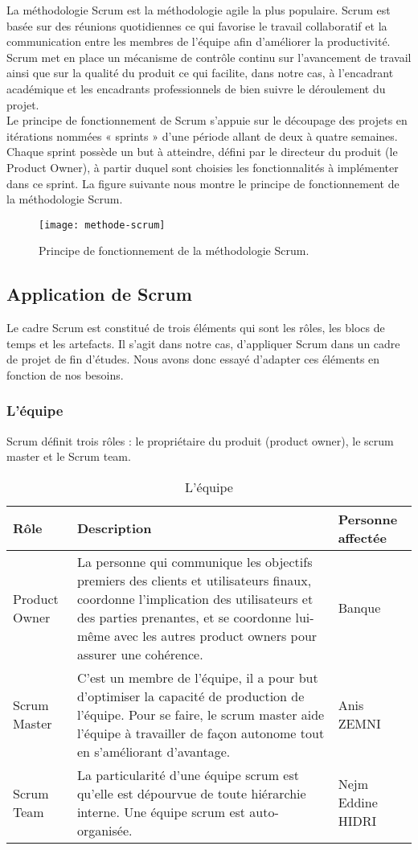 La méthodologie Scrum est la méthodologie agile la plus populaire. Scrum est basée sur des réunions quotidiennes ce qui favorise le travail collaboratif et la communication entre les membres de l’équipe afin d’améliorer la productivité. \\
Scrum met en place un mécanisme de contrôle continu sur l’avancement de travail ainsi que sur la qualité du produit ce qui facilite, dans notre cas, à l’encadrant académique et les encadrants professionnels de bien suivre le déroulement du projet. \\
Le principe de fonctionnement de Scrum s’appuie sur le découpage des projets en itérations nommées « sprints » d’une période allant de deux à quatre semaines. Chaque sprint possède un but à atteindre, défini par le directeur du produit (le Product Owner), à partir duquel sont choisies les fonctionnalités à implémenter dans ce sprint. La figure suivante nous montre le principe de fonctionnement de la méthodologie Scrum.
\begin{figure}[htpb]
\centering
\texttt{[image: methode-scrum]}
\caption{Principe de fonctionnement de la méthodologie Scrum.}
\label{fig:mc}
\end{figure}
\subsection{Application de Scrum}
Le cadre Scrum est constitué de trois éléments qui sont les rôles, les blocs de temps et les artefacts. Il s’agit dans notre cas, d’appliquer Scrum dans un cadre de projet de fin d’études. Nous avons donc essayé d’adapter ces éléments en fonction de nos besoins.

\subsubsection{L'équipe}

    Scrum définit trois rôles : le propriétaire du produit (product owner), le scrum master et le Scrum team.\newpage
 \begin{longtable}{| m{3cm} | m{9cm}| m{3cm} | } 
    \caption{L'équipe}
    \hline
    Rôle &	Description	& Personne affectée \\
    \hline
Product Owner &	La personne qui communique les objectifs premiers des clients et utilisateurs finaux, coordonne l’implication des utilisateurs et des parties prenantes, et se coordonne lui-même avec les autres product owners pour assurer une cohérence. & Banque	\\
    \hline
Scrum Master &	C’est un membre de l’équipe, il a pour but d’optimiser la capacité de production de l’équipe. Pour se faire, le scrum master aide l’équipe à travailler de façon autonome tout en s’améliorant d’avantage. &
Anis ZEMNI \\
    \hline
Scrum Team	& La particularité d’une équipe scrum est qu’elle est dépourvue de toute hiérarchie interne. Une équipe scrum est auto-organisée. &	Nejm Eddine HIDRI \\
\hline

 \end{longtable}
 
